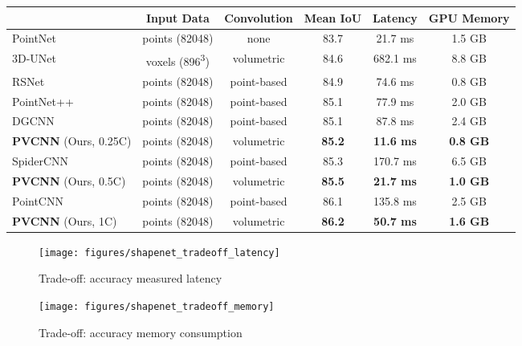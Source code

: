 \documentclass{article}
\def\modelshort{PVCNN\xspace}
\begin{document}
\begin{table*}[!t]
\setlength{\tabcolsep}{6.5pt}
\small\centering
\begin{tabular}{lccccc}
    \toprule
    & Input Data & Convolution & Mean IoU & Latency & GPU Memory \\
    \midrule
    PointNet~\cite{Qi:2017vq} & points (82048) & none & 83.7 & 21.7 ms & 1.5 GB\\
    3D-UNet~\cite{Cicek:2016un} & voxels (896\textsuperscript{3}) & volumetric & 84.6 & 682.1 ms & 8.8 GB\\
    RSNet~\cite{Huang:2018rs} & points (82048) & point-based & 84.9 & 74.6 ms & 0.8 GB\\
    PointNet++~\cite{Qi:2017tf} & points (82048) & point-based & 85.1 & 77.9 ms & 2.0 GB\\
    DGCNN~\cite{Wang:2018dg} & points (82048) & point-based & 85.1 & 87.8 ms & 2.4 GB \\
    \textbf{\modelshort} (Ours, 0.25C) & points (82048) & volumetric & \textbf{85.2} & \textbf{11.6 ms} & \textbf{0.8 GB} \\
    \midrule
    SpiderCNN~\cite{Xu:2018sp} & points (82048) & point-based & 85.3 & 170.7 ms & 6.5 GB \\
    \textbf{\modelshort} (Ours, 0.5C) & points (82048) & volumetric & \textbf{85.5} & \textbf{21.7 ms} & \textbf{1.0 GB} \\
    \midrule
PointCNN~\cite{Li:2018tp} &  points (82048) & point-based & 86.1 & 135.8 ms & 2.5 GB \\
    \textbf{\modelshort} (Ours, 1C) & points (82048) & volumetric & \textbf{86.2} & \textbf{50.7 ms} & \textbf{1.6 GB} \\
    \bottomrule
\end{tabular}
\caption{Results of object part segmentation on ShapeNet Part. On average, \modelshort outperforms the point-based models with \textbf{5.5} measured speedup and \textbf{3} memory reduction, and outperforms the voxel-based baseline with \textbf{59} measured speedup and \textbf{11} memory reduction.}
\label{tab:shapenet_results}
\vspace{-5pt}
\end{table*} \begin{figure*}[!t]
    \centering
    \begin{subfigure}{0.49\textwidth}
        \centering
        \texttt{[image: figures/shapenet\_tradeoff\_latency]}
        \caption{Trade-off: accuracy \vs measured latency}
    \end{subfigure}
    \hfill
    \begin{subfigure}{0.49\textwidth}
        \centering
        \texttt{[image: figures/shapenet\_tradeoff\_memory]}
        \caption{Trade-off: accuracy \vs memory consumption}
    \end{subfigure}
    \caption{Comparisons between \modelshort and point/voxel-based baselines on ShapeNet Part.}
    \label{fig:shapenet_tradeoffs}
    \vspace{-10pt}
\end{figure*}
 
\end{document}
